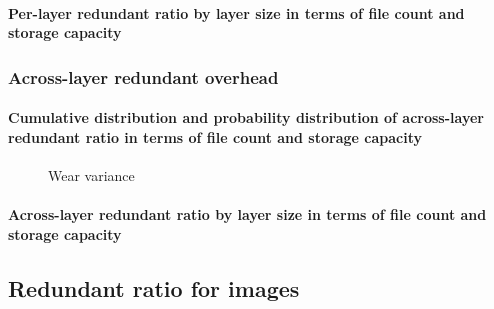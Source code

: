 \paragraph{Per-layer redundant ratio by layer size in terms of file count and storage capacity}

\subsubsection{Across-layer redundant overhead}

\paragraph{Cumulative distribution and probability distribution of across-layer redundant ratio in terms of file count and storage capacity}

\begin{figure}
	\centering
	\caption{Wear variance}
	\label{fig:eval-stdev-erasure-cnt}
\end{figure}

\paragraph{Across-layer redundant ratio by layer size in terms of file count and storage capacity}

\subsection{Redundant ratio for images}

